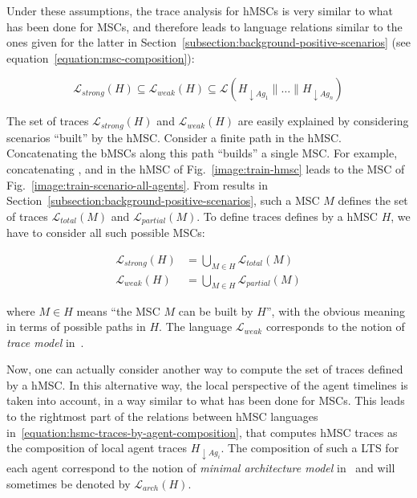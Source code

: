 Under these assumptions, the trace analysis for hMSCs is very similar to what has been done for MSCs, and therefore leads to language relations similar to the ones given for the latter in Section~\ref{subsection:background-positive-scenarios} (see equation~\ref{equation:msc-composition}):

\begin{equation}
\mathcal{L}_{strong}(H) \subseteq \mathcal{L}_{weak}(H) \subseteq \mathcal{L}(H_{\downarrow Ag_1} \parallel \ldots \parallel H_{\downarrow Ag_n})
\label{equation:hsmc-traces-by-agent-composition}
\end{equation}

The set of traces $\mathcal{L}_{strong}(H)$ and $\mathcal{L}_{weak}(H)$ are easily explained by considering scenarios ``built'' by the hMSC. Consider a finite path in the hMSC. Concatenating the bMSCs along this path ``builds'' a single MSC. For example, concatenating ,  and  in the hMSC of Fig.~\ref{image:train-hmsc} leads to the MSC of Fig.~\ref{image:train-scenario-all-agents}. From results in Section~\ref{subsection:background-positive-scenarios}, such a MSC $M$ defines the set of traces $\mathcal{L}_{total}(M)$ and $\mathcal{L}_{partial}(M)$. To define traces defines by a hMSC $H$, we have to consider all such possible MSCs: 

\vspace{-0.5cm}
\begin{align*}
\mathcal{L}_{strong}(H) &= \bigcup_{M \in H} \mathcal{L}_{total}(M) \\
\mathcal{L}_{weak}(H) &= \bigcup_{M \in H} \mathcal{L}_{partial}(M)
\end{align*}

\noindent where $M \in H$ means ``the MSC $M$ can be built by $H$'', with the obvious meaning in terms of possible paths in $H$. The language $\mathcal{L}_{weak}$ corresponds to the notion of \emph{trace model} in~\cite{Uchitel:2004}.

Now, one can actually consider another way to compute the set of traces defined by a hMSC. In this alternative way, the local perspective of the agent timelines is taken into account, in a way similar to what has been done for MSCs. This leads to the rightmost part of the relations between hMSC languages in~\ref{equation:hsmc-traces-by-agent-composition}, that computes hMSC traces as the composition of local agent traces $H_{\downarrow Ag_i}$. The composition of such a LTS for each agent correspond to the notion of \emph{minimal architecture model} in~\cite{Uchitel:2004} and will sometimes be denoted by $\mathcal{L}_{arch}(H)$.

